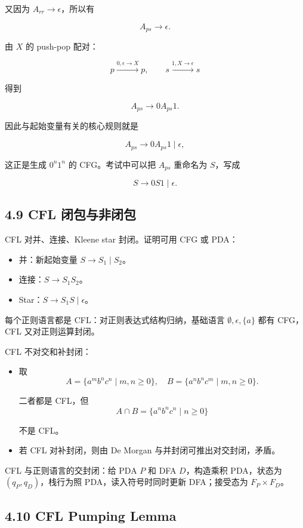 ﻿\documentclass[UTF8,11pt]{ctexart}
\begin{document}
又因为 \(A_{rr}\to\epsilon\)，所以有

\[
A_{ps}\to\epsilon.
\]

由 \(X\) 的 push-pop 配对：

\[
p\xrightarrow{0,\epsilon\to X}p,\qquad
s\xrightarrow{1,X\to\epsilon}s
\]

得到

\[
A_{ps}\to 0A_{ps}1.
\]

因此与起始变量有关的核心规则就是

\[
A_{ps}\to 0A_{ps}1\mid\epsilon,
\]

这正是生成 \(0^n1^n\) 的 CFG。考试中可以把 \(A_{ps}\) 重命名为 \(S\)，写成

\[
S\to0S1\mid\epsilon.
\]


\subsection{4.9 CFL 闭包与非闭包}


CFL 对并、连接、Kleene star 封闭。证明可用 CFG 或 PDA：


\begin{itemize}
\item 并：新起始变量 \(S\to S_1\mid S_2\)。
\item 连接：\(S\to S_1S_2\)。
\item Star：\(S\to S_1S\mid\epsilon\)。
\end{itemize}


每个正则语言都是 CFL：对正则表达式结构归纳，基础语言 \(\emptyset,\epsilon,\{a\}\) 都有 CFG，CFL 又对正则运算封闭。


CFL 不对交和补封闭：


\begin{itemize}
\item 取
\[
  A=\{a^mb^nc^n\mid m,n\ge0\},\quad
  B=\{a^nb^nc^m\mid m,n\ge0\}.
  \]

二者都是 CFL，但
\[
  A\cap B=\{a^nb^nc^n\mid n\ge0\}
  \]

不是 CFL。
\item 若 CFL 对补封闭，则由 De Morgan 与并封闭可推出对交封闭，矛盾。
\end{itemize}


CFL 与正则语言的交封闭：给 PDA \(P\) 和 DFA \(D\)，构造乘积 PDA，状态为 \((q_P,q_D)\)，栈行为照 PDA，读入符号时同时更新 DFA；接受态为 \(F_P\times F_D\)。


\subsection{4.10 CFL Pumping Lemma}
\end{document}
